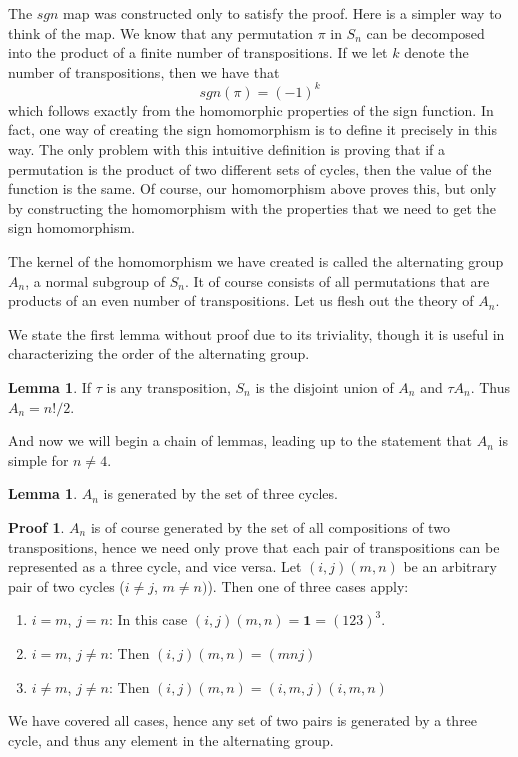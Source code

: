 \documentclass[12pt]{amsbook}
\theoremstyle{definition}
\newtheorem{lemma}[theorem]{Lemma}
\newtheorem*{prf}{Proof}
\begin{document}
The $sgn$ map was constructed only to satisfy the proof. Here is a simpler way to think of the map. We know that any permutation $\pi$ in $S_n$ can be decomposed into the product of a finite number of transpositions. If we let $k$ denote the number of transpositions, then we have that
%
\[ sgn(\pi) = (-1)^k \]
%
which follows exactly from the homomorphic properties of the sign function. In fact, one way of creating the sign homomorphism is to define it precisely in this way. The only problem with this intuitive definition is proving that if a permutation is the product of two different sets of cycles, then the value of the function is the same. Of course, our homomorphism above proves this, but only by constructing the homomorphism with the properties that we need to get the sign homomorphism.

The kernel of the homomorphism we have created is called the alternating group $A_n$, a normal subgroup of $S_n$. It of course consists of all permutations that are products of an even number of transpositions. Let us flesh out the theory of $A_n$.

We state the first lemma without proof due to its triviality, though it is useful in characterizing the order of the alternating group.

\begin{lemma} If $\tau$ is any transposition, $S_n$ is the disjoint union of $A_n$ and $\tau A_n$. Thus $A_n = n!/2$. \end{lemma}

And now we will begin a chain of lemmas, leading up to the statement that $A_n$ is simple for $n \neq 4$.

\begin{lemma}
    $A_n$ is generated by the set of three cycles.
\end{lemma}
\begin{prf}
    $A_n$ is of course generated by the set of all compositions of two transpositions, hence we need only prove that each pair of transpositions can be represented as a three cycle, and vice versa. Let $(i, j)(m, n)$ be an arbitrary pair of two cycles ($i \neq j$, $m \neq n)$). Then one of three cases apply:
    \vspace{-3mm}
    \begin{enumerate}
        \item $i = m$, $j = n$: In this case $(i, j)(m, n) = \mathbf{1} = (1 2 3)^3$.
        \item $i = m$, $j \neq n$: Then $(i, j)(m, n) = (m n j)$
        \item $i \neq m$, $j \neq n$: Then $(i, j)(m, n) = (i, m, j)(i, m, n)$\\
    \end{enumerate}
    \vspace{-7mm}
    We have covered all cases, hence any set of two pairs is generated by a three cycle, and thus any element in the alternating group.
\end{prf}
\end{document}
